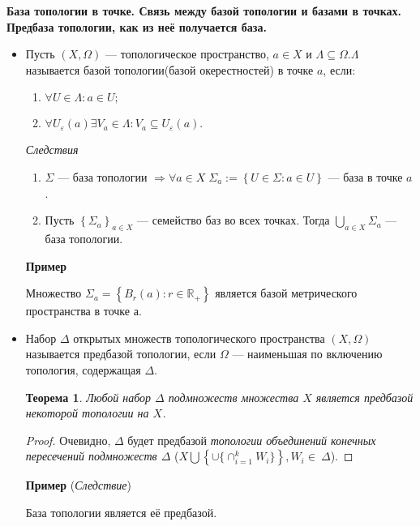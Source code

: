 \documentclass[a4paper,100pt]{article}
\theoremstyle{indented}
\newtheorem{theorem}{Теорема}
\begin{document}
\textbf{База топологии в точке. Связь между базой топологии и базами в точках. Предбаза топологии, как из неё получается база.}\\
    \begin{itemize}
    \item 
    Пусть $\left(X, \Omega\right)$ --- топологическое пространство, $a \in X$ и $\Lambda \subseteq \Omega. \Lambda$ называется базой топологии(базой окерестностей) в точке $a$, если:
    \begin{enumerate}
        \item $\forall U \in \Lambda: a \in U;$ 
        \item $\forall U_\varepsilon (a) \exists V_a \in \Lambda: V_a \subseteq U_\varepsilon (a).$
    \end{enumerate}
    
    \textit{Следствия}
    
    \begin{enumerate}
        \item $\Sigma$ --- база топологии $\Rightarrow \forall a \in X \; \Sigma_a := \left\{ U \in \Sigma: a \in U \right\}$ --- база в точке $a$. 
        \item Пусть $\left\{ \Sigma_a\right\}_{a \in X}$ --- семейство баз во всех точках. Тогда $\bigcup_{a \in X} \Sigma_a$ --- база топологии.
    \end{enumerate}
    
    \textbf{Пример}
    
    Множество $\Sigma_a = \left\{B_r(a): r \in \mathbb R_+ \right\}$ является базой метрического пространства в точке а.
    \item
    Набор $\Delta$ открытых множеств топологического пространства $\left(X, \Omega \right)$ называется предбазой топологии, если $\Omega$ --- наименьшая по включению топология, содержащая $\Delta$.
    
    \begin{theorem}
        Любой набор $\Delta$ подмножеств множества $X$ является предбазой некоторой топологии на $X$.
    \end{theorem}
    \begin{proof}
    
         Очевидно, $\Delta$ будет предбазой \textit{топологии объединений конечных пересечений подмножеств $\Delta$} ($X \bigcup \left\{ \cup\{\cap_{i=1}^k W_i\}\right\}, W_i\in~ \Delta$).
    \end{proof}
    \textbf{Пример} (\textit{Следствие})
    
    База топологии является её предбазой.
    \end{itemize}
\end{document}
